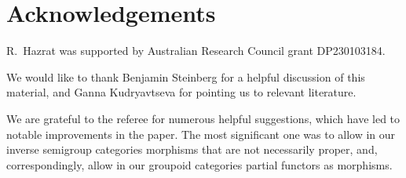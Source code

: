 \documentclass[a4paper,reqno,12pt]{amsart}
\numberwithin{equation}{section}
\theoremstyle{plain}
\theoremstyle{definition}
\begin{document}
\section*{Acknowledgements}

R.\ Hazrat was supported by Australian Research Council grant DP230103184. 

We would like to thank Benjamin Steinberg for a helpful discussion of this material, and Ganna Kudryavtseva for pointing us to relevant literature. 

We are grateful to the referee for numerous helpful suggestions, which have led to notable improvements in the paper. The most significant one was to allow in our inverse semigroup categories morphisms that are not necessarily proper, and, correspondingly, allow in our groupoid categories partial functors as morphisms.
\end{document}
